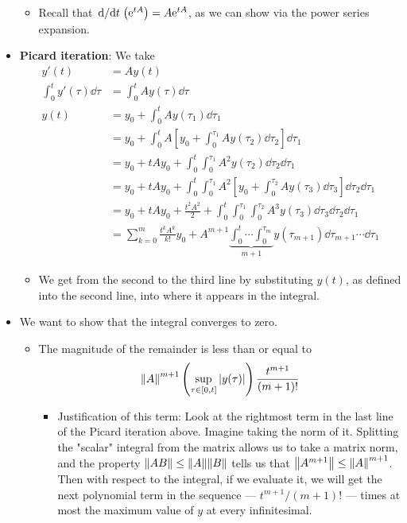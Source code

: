 \documentclass[../notes.tex]{subfiles}
\begin{document}
\begin{itemize}
    \begin{itemize}
        \item Recall that $\dv*{t}(\e[tA])=A\e[tA]$, as we can show via the power series expansion.
    \end{itemize}
    \item \textbf{Picard iteration}: We take
    \begingroup
    \allowdisplaybreaks
    \begin{align*}
        y'(t) &= Ay(t)\\
        \int_0^ty'(\tau)\dd{\tau} &= \int_0^tAy(\tau)\dd\tau\\
        y(t) &= y_0+\int_0^tAy(\tau_1)\dd\tau_1\\
        &= y_0+\int_0^tA\left[ y_0+\int_0^{\tau_1}Ay(\tau_2)\dd\tau_2 \right]\dd\tau_1\\
        &= y_0+tAy_0+\int_0^t\int_0^{\tau_1}A^2y(\tau_2)\dd\tau_2\dd\tau_1\\
        &= y_0+tAy_0+\int_0^t\int_0^{\tau_1}A^2\left[ y_0+\int_0^{\tau_2}Ay(\tau_3)\dd\tau_3 \right]\dd\tau_2\dd\tau_1\\
        &= y_0+tAy_0+\frac{t^2A^2}{2}+\int_0^t\int_0^{\tau_1}\int_0^{\tau_2}A^3y(\tau_3)\dd\tau_3\dd\tau_2\dd\tau_1\\
        &= \sum_{k=0}^m\frac{t^kA^k}{k!}y_0+A^{m+1}\underbrace{\int_0^t\cdots\int_0^{\tau_m}}_{m+1}y(\tau_{m+1})\dd\tau_{m+1}\cdots\dd\tau_1
    \end{align*}
    \endgroup
    \begin{itemize}
        \item We get from the second to the third line by substituting $y(t)$, as defined into the second line, into where it appears in the integral.
    \end{itemize}
    \item We want to show that the integral converges to zero.
    \begin{itemize}
        \item The magnitude of the remainder is less than or equal to
        \begin{equation*}
            \norm{A}^{m+1}\left( \sup_{\tau\in[0,t]}|y(\tau)| \right)\frac{t^{m+1}}{(m+1)!}
        \end{equation*}
        \begin{itemize}
            \item Justification of this term: Look at the rightmost term in the last line of the Picard iteration above. Imagine taking the norm of it. Splitting the "scalar" integral from the matrix allows us to take a matrix norm, and the property $\norm{AB}\leq\norm{A}\norm{B}$ tells us that $\norm{A^{m+1}}\leq\norm{A}^{m+1}$. Then with respect to the integral, if we evaluate it, we will get the next polynomial term in the sequence --- $t^{m+1}/(m+1)!$ --- times at most the maximum value of $y$ at every infinitesimal.

\end{itemize}
\end{itemize}
\end{itemize}
\end{document}
